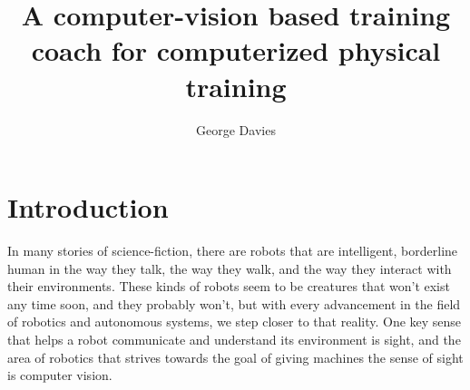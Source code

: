 \documentclass[runningheads]{llncs}
\begin{document}
%
\title{A computer-vision based training coach for computerized physical training}
%
%
\author{George Davies}
%
%
%
\maketitle              %
%



\section{Introduction}
    In many stories of science-fiction, there are robots that are intelligent, borderline human in the way they talk, the way they walk, and the way they interact with their environments. These kinds of robots seem to be creatures that won't exist any time soon, and they probably won't, but with every advancement in the field of robotics and autonomous systems, we step closer to that reality. One key sense that helps a robot communicate and understand its environment is sight, and the area of robotics that strives towards the goal of giving machines the sense of sight is computer vision. 
\end{document}

